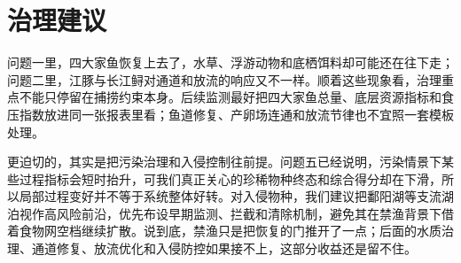\section{治理建议}
问题一里，四大家鱼恢复上去了，水草、浮游动物和底栖饵料却可能还在往下走；问题二里，江豚与长江鲟对通道和放流的响应又不一样。顺着这些现象看，治理重点不能只停留在捕捞约束本身。后续监测最好把四大家鱼总量、底层资源指标和食压指数放进同一张报表里看；鱼道修复、产卵场连通和放流节律也不宜照一套模板处理。

更迫切的，其实是把污染治理和入侵控制往前提。问题五已经说明，污染情景下某些过程指标会短时抬升，可我们真正关心的珍稀物种终态和综合得分却在下滑，所以局部过程变好并不等于系统整体好转。对入侵物种，我们建议把鄱阳湖等支流湖泊视作高风险前沿，优先布设早期监测、拦截和清除机制，避免其在禁渔背景下借着食物网空档继续扩散。说到底，禁渔只是把恢复的门推开了一点；后面的水质治理、通道修复、放流优化和入侵防控如果接不上，这部分收益还是留不住。

